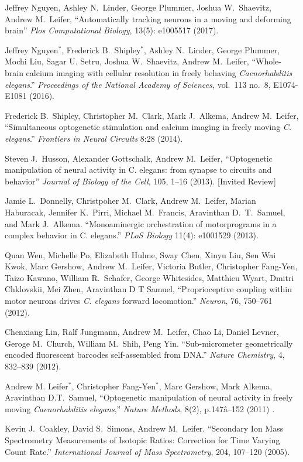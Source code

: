 \documentclass[11pt]{article}
\makeatletter
\newlength{\bibhang}
\newlength{\bibsep}
\newcounter{Lcount}
 {\@listi \global\bibsep\itemsep \global\advance\bibsep by\parsep}
\newenvironment{bibsection}%
        {\begin{list}{\arabic{Lcount}.}{%
       \usecounter{Lcount}%
       \setlength\labelwidth{-0.5em}%
       \setlength{\leftmargin}{\bibhang}%
       \setlength{\itemindent}{-\leftmargin}%
       \setlength{\itemsep}{\bibsep}%
       \setlength{\parsep}{\z@}%
        \setlength{\partopsep}{0pt}%
        \setlength{\topsep}{0pt}}}
        {\end{list}\vspace{-.6\baselineskip}}
\makeatother
\begin{document}
\begin{bibsection}
\item Jeffrey Nguyen,  Ashley N.~Linder, George Plummer, Joshua
W.~Shaevitz, Andrew M.~Leifer, ``Automatically tracking neurons in a moving and deforming brain'' \emph{Plos Computational Biology}, 13(5): e1005517 (2017).
	
\item Jeffrey Nguyen$^{*}$, Frederick B.~Shipley$^{*}$, Ashley N.~Linder, George Plummer, Mochi Liu, Sagar U. Setru, Joshua
W.~Shaevitz, Andrew M.~Leifer, ``Whole-brain calcium imaging with cellular resolution in freely behaving \textit{Caenorhabditis elegans}.'' \emph{Proceedings of the National Academy of Sciences,}  vol.~113 no.~8, E1074-E1081 (2016). 

\item Frederick B.~Shipley, Christopher M.~Clark,  Mark J.~Alkema, Andrew M.~Leifer, ``Simultaneous optogenetic stimulation and calcium imaging in freely moving \textit{C. elegans}.'' \emph{Frontiers in Neural Circuits} 8:28 (2014).
	
\item Steven J.~Husson, Alexander Gottschalk, Andrew M.~Leifer, ``Optogenetic manipulation of neural activity in C. elegans: from synapse to circuits and behavior'' \emph{Journal of Biology of the Cell}, 105, 1--16 (2013).  [Invited Review]

\item Jamie L.~Donnelly, Christpoher M.~Clark, Andrew M.~Leifer, Marian Haburacak, Jennifer K.~Pirri, Michael M.~Francis, Aravinthan D.~T.~Samuel, and Mark J.~Alkema. ``Monoaminergic orchestration of motorprograms in a complex behavior in C. elegans.'' \emph{PLoS Biology}  11(4): e1001529 (2013).	

\item Quan Wen, Michelle Po, Elizabeth Hulme, Sway Chen, Xinyu Liu, Sen Wai Kwok, Marc Gershow,  Andrew M.~Leifer, Victoria Butler, Christopher Fang-Yen, Taizo Kawano, William R.~Schafer, George Whitesides, Matthieu Wyart, Dmitri Chklovskii, Mei Zhen, Aravinthan D T Samuel, ``Proprioceptive coupling within motor neurons drives \emph{C. elegans} forward locomotion.'' \emph{Neuron}, 76, 750--761 (2012).

\item Chenxiang Lin, Ralf Jungmann, Andrew M.~Leifer, Chao Li, Daniel Levner, Geroge M.~Church, William M.~Shih, Peng Yin. ``Sub-micrometer geometrically encoded fluorescent barcodes self-assembled from DNA.'' \emph{Nature Chemistry}, 4, 832--839 (2012).

\item Andrew M. Leifer$^{*}$, Christopher Fang-Yen$^{*}$, Marc Gershow, Mark Alkema, Aravinthan D.T.~Samuel, ``Optogenetic manipulation of neural activity in freely moving \emph{Caenorhabditis elegans},'' \emph{Nature Methods}, 8(2), p.147â--152 (2011) . 

\item Kevin J.~Coakley, David S.~Simons, Andrew M.~Leifer. ``Secondary Ion Mass Spectrometry Measurements of Isotopic Ratios: Correction for Time Varying Count Rate.'' \emph{International Journal of Mass Spectrometry}, 204, 107--120 (2005).

\end{bibsection}
\end{document}

